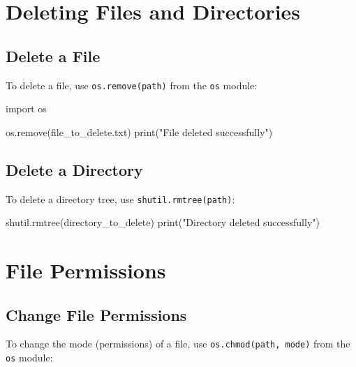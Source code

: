 \documentclass[
  letterpaper,
  DIV=11,
  numbers=noendperiod]{scrreprt}
\newenvironment{Shaded}{\begin{snugshade}}{\end{snugshade}}
\newcommand{\BuiltInTok}[1]{\textcolor[rgb]{0.00,0.23,0.31}{#1}}
\newcommand{\ImportTok}[1]{\textcolor[rgb]{0.00,0.46,0.62}{#1}}
\newcommand{\NormalTok}[1]{\textcolor[rgb]{0.00,0.23,0.31}{#1}}
\newcommand{\StringTok}[1]{\textcolor[rgb]{0.13,0.47,0.30}{#1}}
\begin{document}
\section{Deleting Files and
Directories}\label{deleting-files-and-directories}

\subsection{Delete a File}\label{delete-a-file}

To delete a file, use \texttt{os.remove(path)} from the \texttt{os}
module:

\begin{Shaded}
\begin{Highlighting}[]
\ImportTok{import}\NormalTok{ os}

\NormalTok{os.remove(}\StringTok{\textquotesingle{}file\_to\_delete.txt\textquotesingle{}}\NormalTok{)}
\BuiltInTok{print}\NormalTok{(}\StringTok{"File deleted successfully"}\NormalTok{)}
\end{Highlighting}
\end{Shaded}

\subsection{Delete a Directory}\label{delete-a-directory}

To delete a directory tree, use \texttt{shutil.rmtree(path)}:

\begin{Shaded}
\begin{Highlighting}[]
\NormalTok{shutil.rmtree(}\StringTok{\textquotesingle{}directory\_to\_delete\textquotesingle{}}\NormalTok{)}
\BuiltInTok{print}\NormalTok{(}\StringTok{"Directory deleted successfully"}\NormalTok{)}
\end{Highlighting}
\end{Shaded}

\section{File Permissions}\label{file-permissions}

\subsection{Change File Permissions}\label{change-file-permissions}

To change the mode (permissions) of a file, use
\texttt{os.chmod(path,\ mode)} from the \texttt{os} module:
\end{document}

